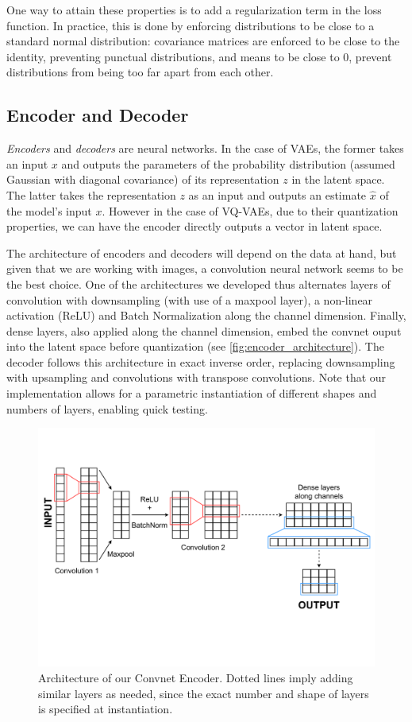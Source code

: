 \documentclass{article}
\begin{document}
One way to attain these properties is to add a regularization term in the loss function.
In practice, this is done by enforcing distributions to be close to a standard normal distribution: covariance matrices are enforced to be close to the identity, preventing punctual distributions, and means to be close to 0,
prevent distributions from being too far apart from each other.

\subsection{Encoder and Decoder}
\textit{Encoders} and \textit{decoders} are neural networks. In the case of VAEs, the former takes an input $x$ and outputs the parameters of the probability distribution (assumed Gaussian with diagonal covariance) of its representation $z$ in the latent space. The latter takes the representation $z$ as an input and outputs an estimate $\hat{x}$ of the model's input $x$. However in the case of VQ-VAEs, due to their quantization properties, we can have the encoder directly outputs a vector in latent space.

The architecture of encoders and decoders will depend on the data at hand, but given that we are working with images, a convolution neural network seems to be the best choice. One of the architectures we developed thus alternates layers of convolution with downsampling (with use of a maxpool layer), a non-linear activation (ReLU) and Batch Normalization along the channel dimension. Finally, dense layers, also applied along the channel dimension, embed the convnet ouput into the latent space before quantization (see \autoref{fig:encoder_architecture}). The decoder follows this architecture in exact inverse order, replacing downsampling with upsampling and convolutions with transpose convolutions. Note that our implementation allows for a parametric instantiation of different shapes and numbers of layers, enabling quick testing. 

\begin{figure}
    \includegraphics[width=\columnwidth]{figs/encoder.pdf}
    \caption{Architecture of our Convnet Encoder. Dotted lines imply adding similar layers as needed, since the exact number and shape of layers is specified at instantiation.}
    \label{fig:encoder_architecture}
\end{figure}
\end{document}
